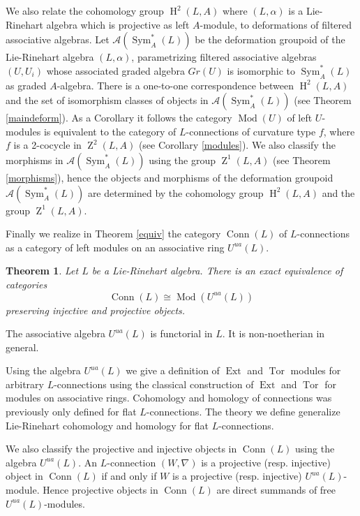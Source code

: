 \documentclass{amsart}
\theoremstyle{plain}
\newtheorem{theorem}{Theorem}[section]
\theoremstyle{definition}
\theoremstyle{remark}
\numberwithin{equation}{theorem}
\begin{document}
We also relate the cohomology group ${\operatorname{H} }^2(L,{A})$ where $(L,\alpha)$ is a Lie-Rinehart algebra which is projective as left
${A}$-module, to deformations of filtered associative algebras. Let ${\mathcal{A}}({\operatorname{Sym} }_{A}^*(L))$ be the deformation groupoid of the 
Lie-Rinehart algebra $(L,\alpha)$, parametrizing filtered associative algebras $(U,U_i)$ whose associated graded algebra
$Gr(U)$ is isomorphic to ${\operatorname{Sym} }_{A}^*(L)$ as graded ${A}$-algebra.
There is a one-to-one correspondence between ${\operatorname{H} }^2(L,{A})$ and the set
of isomorphism classes of objects in ${\mathcal{A}}({\operatorname{Sym} }_{A}^*(L))$ (see Theorem \ref{maindeform}).
As a Corollary it follows the category ${\operatorname{Mod}}(U)$ of left $U$-modules is equivalent to the category of $L$-connections
of curvature type $f$, where $f$ is a 2-cocycle in ${\operatorname{Z}}^2(L,{A})$ (see Corollary \ref{modules}).
We also classify the morphisms in ${\mathcal{A}}({\operatorname{Sym} }_{A}^*(L))$ using the group ${\operatorname{Z}}^1(L,{A})$ 
(see Theorem \ref{morphisms}), hence the objects and morphisms of the 
deformation groupoid ${\mathcal{A}}({\operatorname{Sym} }_{A}^*(L))$ are determined by the cohomology group ${\operatorname{H} }^2(L,{A})$ and the group ${\operatorname{Z}}^1(L,{A})$.

Finally we realize in Theorem \ref{equiv} the category ${\operatorname{Conn}}(L)$ of $L$-connections as a category of left 
modules on an associative ring
${U^{ua}}(L)$. 

\begin{theorem} Let $L$ be a Lie-Rinehart algebra. There is an exact equivalence of categories
\[ {\operatorname{Conn}}(L)\cong {\operatorname{Mod}}({U^{ua}}(L)) \]
preserving injective and projective objects.
\end{theorem}
The associative algebra ${U^{ua}}(L)$ is functorial in $L$. It is non-noetherian in general.

Using the algebra ${U^{ua}}(L)$ we give a definition of ${\operatorname{Ext} }$ and ${\operatorname{Tor} }$ modules
for arbitrary $L$-connections using the classical construction of ${\operatorname{Ext} }$ and ${\operatorname{Tor} }$ for modules on associative rings.
Cohomology and homology of connections was previously only defined for flat $L$-connections. The theory we 
define generalize Lie-Rinehart cohomology and homology for flat $L$-connections. 

We also classify the projective and injective objects in ${\operatorname{Conn}}(L)$ using the algebra ${U^{ua}}(L)$. An $L$-connection 
$(W,\nabla)$ is a projective (resp. injective) object in ${\operatorname{Conn}}(L)$ if and only if $W$ is a projective 
(resp. injective) ${U^{ua}}(L)$-module.
Hence projective objects in ${\operatorname{Conn}}(L)$ are direct summands of free ${U^{ua}}(L)$-modules.
\end{document}
